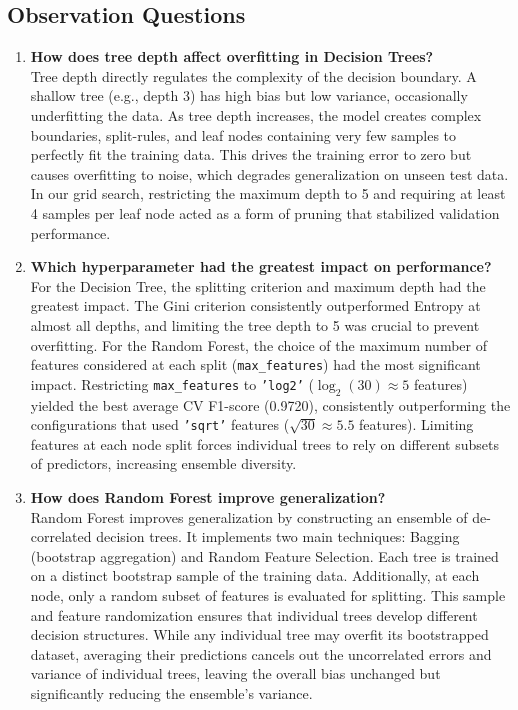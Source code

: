 \documentclass[12pt,a4paper]{article}
\begin{document}
\subsection{Observation Questions}
\begin{enumerate}
    \item \textbf{How does tree depth affect overfitting in Decision Trees?}\\
    Tree depth directly regulates the complexity of the decision boundary. A shallow tree (e.g., depth 3) has high bias but low variance, occasionally underfitting the data. As tree depth increases, the model creates complex boundaries, split-rules, and leaf nodes containing very few samples to perfectly fit the training data. This drives the training error to zero but causes overfitting to noise, which degrades generalization on unseen test data. In our grid search, restricting the maximum depth to 5 and requiring at least 4 samples per leaf node acted as a form of pruning that stabilized validation performance.
    
    \item \textbf{Which hyperparameter had the greatest impact on performance?}\\
    For the Decision Tree, the splitting criterion and maximum depth had the greatest impact. The Gini criterion consistently outperformed Entropy at almost all depths, and limiting the tree depth to 5 was crucial to prevent overfitting. For the Random Forest, the choice of the maximum number of features considered at each split (\texttt{max\_features}) had the most significant impact. Restricting \texttt{max\_features} to \texttt{'log2'} ($\log_2(30) \approx 5$ features) yielded the best average CV F1-score (0.9720), consistently outperforming the configurations that used \texttt{'sqrt'} features ($\sqrt{30} \approx 5.5$ features). Limiting features at each node split forces individual trees to rely on different subsets of predictors, increasing ensemble diversity.
    
    \item \textbf{How does Random Forest improve generalization?}\\
    Random Forest improves generalization by constructing an ensemble of de-correlated decision trees. It implements two main techniques: Bagging (bootstrap aggregation) and Random Feature Selection. Each tree is trained on a distinct bootstrap sample of the training data. Additionally, at each node, only a random subset of features is evaluated for splitting. This sample and feature randomization ensures that individual trees develop different decision structures. While any individual tree may overfit its bootstrapped dataset, averaging their predictions cancels out the uncorrelated errors and variance of individual trees, leaving the overall bias unchanged but significantly reducing the ensemble's variance.
    

\end{enumerate}
\end{document}
